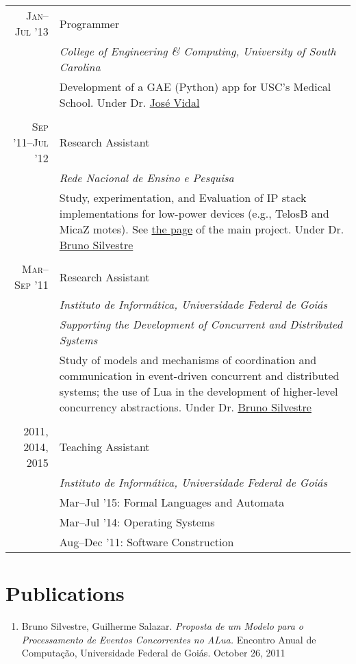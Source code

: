 \documentclass[a4paper,10pt]{article}
\begin{document}
\begin{longtable}{r|p{11cm}}
  \textsc{Jan--Jul '13}
  & Programmer \\
  &\emph{College of Engineering \& Computing, University of South Carolina}\\
  &\footnotesize{Development of a GAE (Python) app for USC's Medical School. Under
  Dr. \href{http://jmvidal.cse.sc.edu}{José Vidal}}\\
  \multicolumn{2}{c}{} \\

  \textsc{Sep '11--Jul '12}
  & Research Assistant \\
  &\emph{Rede Nacional de Ensino e Pesquisa}\\
  &\footnotesize{Study, experimentation, and Evaluation of IP stack implementations 
  for low-power devices (e.g., TelosB and MicaZ motes). See 
            \href{http://www.nr2.ufpr.br/cia2/}{the page} of the main project.
  Under Dr. \href{http://inf.ufg.br/~brunoos/}{Bruno Silvestre}}\\
  \multicolumn{2}{c}{} \\

  \textsc{Mar--Sep '11}
  & Research Assistant \\
  &\emph{Instituto de Informática, Universidade Federal de Goiás}\\
  &\emph{Supporting the Development of Concurrent and Distributed Systems}\\
  &\footnotesize{Study of models and mechanisms of coordination and 
        communication in event-driven concurrent and distributed systems; the 
        use of Lua in the development of higher-level concurrency abstractions.
  Under Dr. \href{http://inf.ufg.br/~brunoos/}{Bruno Silvestre}}\\
  \multicolumn{2}{c}{} \\

  \textsc{2011, 2014, 2015}
  & Teaching Assistant \\
  &\emph{Instituto de Informática, Universidade Federal de Goiás} \\
  &\footnotesize{Mar--Jul '15: Formal Languages and Automata} \\
  &\footnotesize{Mar--Jul '14: Operating Systems} \\
  &\footnotesize{Aug--Dec '11: Software Construction}
\end{longtable}

\section{Publications}
\begin{enumerate}
  \renewcommand{\labelenumi}{[\arabic{enumi}] }
  \item Bruno Silvestre, Guilherme Salazar. \emph{Proposta de um Modelo para o
        Processamento de Eventos Concorrentes no ALua.} Encontro Anual de
        Computação, Universidade Federal de Goiás. October 26, 2011
\end{enumerate}
\end{document}
